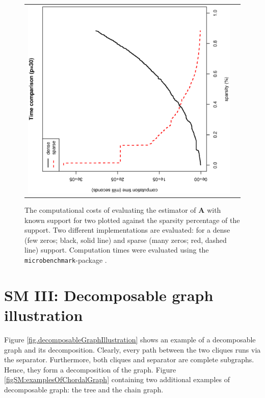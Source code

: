 \documentclass[a4paper]{article}
\begin{document}
\begin{figure}[h!]
\begin{tabular}{ll}
\includegraphics[scale=0.28,angle=270]{timeComparison_p30.ps}
\end{tabular}
\caption{The computational costs of evaluating the estimator of $\mathbf{A}$ with known support for two plotted against the sparsity percentage of the support. Two different implementations are evaluated: for a dense (few zeros; black, solid line) and sparse (many zeros; red, dashed line) support. Computation times were evaluated using the {\tt microbenchmark}-package \citep{Mers2014}. }
\label{figSM:timeComparison}
\end{figure}




\newpage
\section*{SM III: Decomposable graph illustration}
Figure \ref{fig.decomposableGraphIllustration} shows an example of a decomposable graph and its decomposition. Clearly, every path between the two cliques runs via the separator. Furthermore, both cliques and separator are complete subgraphs. Hence, they form a decomposition of the graph. Figure \ref{figSM:examplesOfChordalGraph} containing two additional examples of decomposable graph: the tree and the chain graph.
\end{document}
